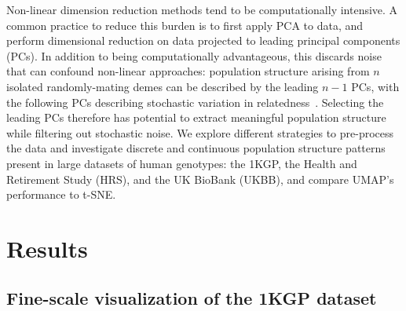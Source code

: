 Non-linear dimension reduction methods tend to be computationally intensive. A common practice to reduce this burden is to first apply PCA to data, and perform dimensional reduction on data projected to leading principal components (PCs). In addition to being computationally advantageous, this discards noise that can confound non-linear approaches: population structure arising from $n$ isolated randomly-mating demes can be described by the leading $n-1$ PCs, with the following PCs describing stochastic variation in relatedness~\citep{eigen2006}. Selecting the leading PCs therefore has potential to extract meaningful population structure while filtering out stochastic noise. We explore different strategies to pre-process the data and investigate discrete and continuous population structure patterns present in large datasets of human genotypes: the 1KGP, the Health and Retirement Study (HRS)\citep{juster1995overview}, and the UK BioBank (UKBB)\citep{sudlow2015uk}, and compare UMAP's performance to t-SNE.  

\section{Results}
\subsection{Fine-scale visualization of the 1KGP dataset}

